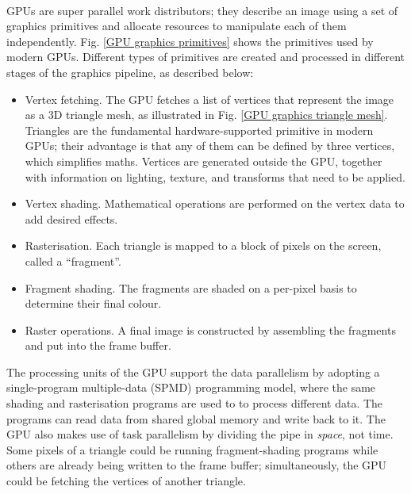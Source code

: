\documentclass[12pt, twocolumn]{report}
\begin{document}
\paragraph{}
GPUs are super parallel work distributors; they describe an image using a set of graphics primitives and allocate resources to manipulate each of them independently. Fig. \ref{GPU graphics primitives} shows the primitives used by modern GPUs. Different types of primitives are created and processed in different stages of the graphics pipeline, as described below:
\begin{itemize}
    \item Vertex fetching. The GPU fetches a list of vertices that represent the image as a 3D triangle mesh, as illustrated in Fig. \ref{GPU graphics triangle mesh}. Triangles are the fundamental hardware-supported primitive in modern GPUs; their advantage is that any of them can be defined by three vertices, which simplifies maths. Vertices are generated outside the GPU, together with information on lighting, texture, and transforms that need to be applied.
    \item Vertex shading. Mathematical operations are performed on the vertex data to add desired effects.
    \item Rasterisation. Each triangle is mapped to a block of pixels on the screen, called a ``fragment''.
    \item Fragment shading. The fragments are shaded on a per-pixel basis to determine their final colour.
    \item Raster operations. A final image is constructed by assembling the fragments and put into the frame buffer.
\end{itemize}
The processing units of the GPU support the data parallelism by adopting a single-program multiple-data (SPMD) programming model, where the same shading and rasterisation programs are used to to process different data. The programs can read data from shared global memory and write back to it. The GPU also makes use of task parallelism by dividing the pipe in \textit{space}, not time. Some pixels of a triangle could be running fragment-shading programs while others are already being written to the frame buffer; simultaneously, the GPU could be fetching the vertices of another triangle.
\end{document}
